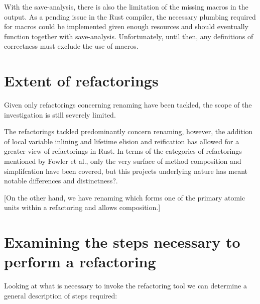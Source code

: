 With the save-analysis, there is also the limitation of the missing macros in the output. As a pending issue in the Rust compiler, the necessary plumbing required for macros could be implemented given enough resources and should eventually function together with save-analysis. Unfortunately, until then, any definitions of correctness must exclude the use of macros. 

\section{Extent of refactorings}
Given only refactorings concerning renaming have been tackled, the scope of the investigation is still severely limited. 

The refactorings tackled predominantly concern renaming, however, the addition of local variable inlining and lifetime elision and reification has allowed for a greater view of refactorings in Rust. In terms of the categories of refactorings mentioned by Fowler et al., only the very surface of method composition and simplifcation have been covered, but this projects underlying nature has meant notable differences and distinctness?. 

[On the other hand, we have renaming which forms one of the primary atomic units within a refactoring and allows composition.]


\section{Examining the steps necessary to perform a refactoring}

Looking at what is necessary to invoke the refactoring tool we can determine a general description of steps required:

